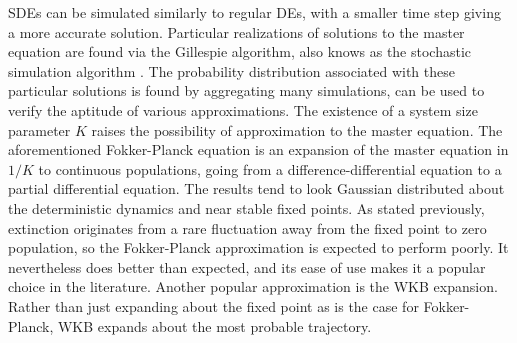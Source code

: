 SDEs can be simulated similarly to regular DEs, with a smaller time step giving a more accurate solution. 
Particular realizations of solutions to the master equation are found via the Gillespie algorithm, also knows as the stochastic simulation algorithm \cite{Gillespie1977,Cao2006}. 
The probability distribution associated with these particular solutions is found by aggregating many simulations, can be used to verify the aptitude of various approximations. 
The existence of a system size parameter $K$ raises the possibility of approximation to the master equation. %
The aforementioned Fokker-Planck equation is an expansion of the master equation in $1/K$ to continuous populations, going from a difference-differential equation to a partial differential equation. %
The results tend to look Gaussian distributed about the deterministic dynamics and near stable fixed points. %
As stated previously, extinction originates from a rare fluctuation away from the fixed point to zero population, so the Fokker-Planck approximation is expected to perform poorly. 
It nevertheless does better than expected, and its ease of use makes it a popular choice in the literature. 
%
Another popular approximation is the WKB expansion.
Rather than just expanding about the fixed point as is the case for Fokker-Planck, WKB expands about the most probable trajectory.
